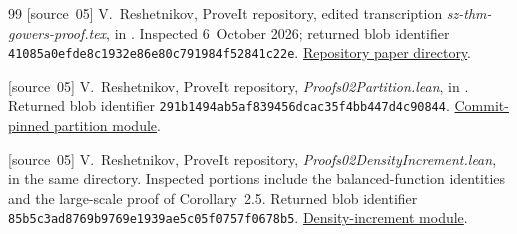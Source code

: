 \documentclass[11pt,letterpaper]{article}
\numberwithin{equation}{section}
\theoremstyle{definition}
\theoremstyle{remark}
\newcommand{\1}{\mathbf 1}
\begin{document}
\begin{thebibliography}{99}
[source~05] V.~Reshetnikov, ProveIt repository, edited transcription \emph{sz-thm-gowers-proof.tex}, in . Inspected 6~October 2026; returned blob identifier \texttt{41085a0efde8c1932e86e80c791984f52841c22e}. \href{https://github.com/VladimirReshetnikov/ProveIt/tree/main/Combinatorics/Ramsey/Papers/sz-thm-gowers-proof}{Repository paper directory}.

[source~05] V.~Reshetnikov, ProveIt repository, \emph{Proofs02Partition.lean}, in . Returned blob identifier \texttt{291b1494ab5af839456dcac35f4bb447d4c90844}. \href{https://github.com/VladimirReshetnikov/ProveIt/blob/327773149bd272239f1f6c0015f76d5097512c88/Combinatorics/Ramsey/Lean/GowersSzemeredi/Proofs02Partition.lean}{Commit-pinned partition module}.

[source~05] V.~Reshetnikov, ProveIt repository, \emph{Proofs02DensityIncrement.lean}, in the same directory. Inspected portions include the balanced-function identities and the large-scale proof of Corollary~2.5. Returned blob identifier \texttt{85b5c3ad8769b9769e1939ae5c05f0757f0678b5}. \href{https://github.com/VladimirReshetnikov/ProveIt/blob/main/Combinatorics/Ramsey/Lean/GowersSzemeredi/Proofs02DensityIncrement.lean}{Density-increment module}.
\end{thebibliography}
\end{document}
